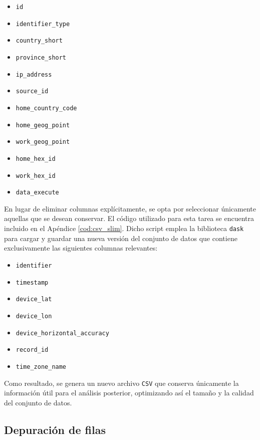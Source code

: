 \begin{itemize}
    \item \texttt{id}
    \item \texttt{identifier\_type}
    \item \texttt{country\_short}
    \item \texttt{province\_short}
    \item \texttt{ip\_address}
    \item \texttt{source\_id}
    \item \texttt{home\_country\_code}
    \item \texttt{home\_geog\_point}
    \item \texttt{work\_geog\_point}
    \item \texttt{home\_hex\_id}
    \item \texttt{work\_hex\_id}
    \item \texttt{data\_execute}
\end{itemize}

En lugar de eliminar columnas explícitamente, se opta por seleccionar únicamente aquellas que se desean conservar. El código utilizado para esta tarea se encuentra incluido en el Apéndice \ref{cod:csv_slim}. Dicho script emplea la biblioteca \texttt{dask} para cargar y guardar una nueva versión del conjunto de datos que contiene exclusivamente las siguientes columnas relevantes:

\begin{itemize}
    \item \texttt{identifier}
    \item \texttt{timestamp}
    \item \texttt{device\_lat}
    \item \texttt{device\_lon}
    \item \texttt{device\_horizontal\_accuracy}
    \item \texttt{record\_id}
    \item \texttt{time\_zone\_name}
\end{itemize}

Como resultado, se genera un nuevo archivo \texttt{CSV} que conserva únicamente la información útil para el análisis posterior, optimizando así el tamaño y la calidad del conjunto de datos.


\subsection{Depuración de filas}
\label{subsec:depuracion_filas}

